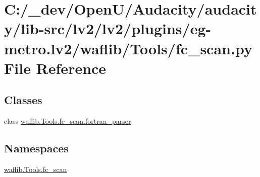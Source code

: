 \hypertarget{lv2_2plugins_2eg-metro_8lv2_2waflib_2_tools_2fc__scan_8py}{}\section{C\+:/\+\_\+dev/\+Open\+U/\+Audacity/audacity/lib-\/src/lv2/lv2/plugins/eg-\/metro.lv2/waflib/\+Tools/fc\+\_\+scan.py File Reference}
\label{lv2_2plugins_2eg-metro_8lv2_2waflib_2_tools_2fc__scan_8py}
\subsection*{Classes}
\begin{DoxyCompactItemize}
\item 
class \hyperlink{classwaflib_1_1_tools_1_1fc__scan_1_1fortran__parser}{waflib.\+Tools.\+fc\+\_\+scan.\+fortran\+\_\+parser}
\end{DoxyCompactItemize}
\subsection*{Namespaces}
\begin{DoxyCompactItemize}
\item 
 \hyperlink{namespacewaflib_1_1_tools_1_1fc__scan}{waflib.\+Tools.\+fc\+\_\+scan}
\end{DoxyCompactItemize}
